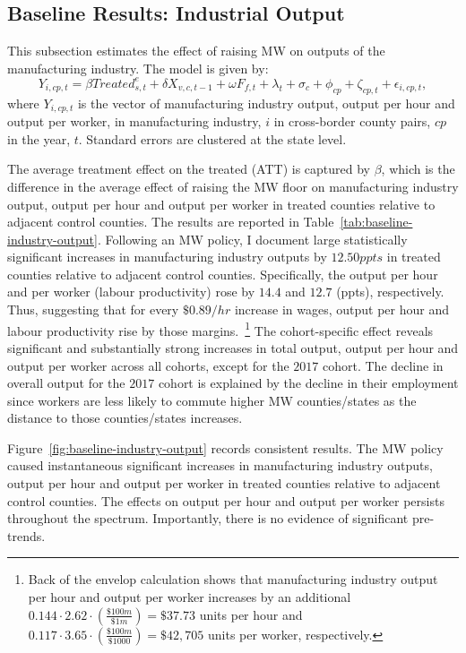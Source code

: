 \documentclass[12pt, english]{article}
\begin{document}
    \subsection{Baseline Results: Industrial Output}\label{subsec:baseline-results-industrial-output}
    This subsection estimates the effect of raising MW on outputs of the manufacturing industry. The model is given by:
    \begin{equation}
        Y_{i,cp,t} = \beta Treated_{s,t}^e + \delta X_{v,c,t-1} + \omega F_{f,t} + \lambda_{t} + \sigma_{c} + \phi_{cp} + \zeta_{cp,t} + \epsilon_{i,cp,t},\label{eq:baseline-output}
    \end{equation}
    where $Y_{i,cp,t}$ is the vector of manufacturing industry output, output per hour and output per worker, in manufacturing industry, $i$ in cross-border county pairs, $cp$ in the year, $t$. Standard errors are clustered at the state level.
    

    The average treatment effect on the treated (ATT) is captured by $\beta$, which is the difference in the average effect of raising the MW floor on manufacturing industry output, output per hour and output per worker in treated counties relative to adjacent control counties. The results are reported in Table~\ref{tab:baseline-industry-output}. Following an MW policy, I document large statistically significant increases in manufacturing industry outputs by $12.50ppts$ in treated counties relative to adjacent control counties. Specifically, the output per hour and per worker (labour productivity) rose by $14.4$ and $12.7$ (ppts), respectively. Thus, suggesting that for every $\$0.89/hr$ increase in wages, output per hour and labour productivity rise by those margins.~\footnote{\tiny Back of the envelop calculation shows that manufacturing industry output per hour and output per worker increases by an additional $0.144 \cdot 2.62 \cdot \left(\frac{\$100m}{\$1m}\right) = \$37.73$ units per hour and $0.117 \cdot 3.65 \cdot \left(\frac{\$100m}{\$1000}\right) = \$42,705$ units per worker, respectively.} The cohort-specific effect reveals significant and substantially strong increases in total output, output per hour and output per worker across all cohorts, except for the $2017$ cohort. The decline in overall output for the $2017$ cohort is explained by the decline in their employment since workers are less likely to commute higher MW counties/states as the distance to those counties/states increases.

    Figure~\ref{fig:baseline-industry-output} records consistent results. The MW policy caused instantaneous significant increases in manufacturing industry outputs, output per hour and output per worker in treated counties relative to adjacent control counties. The effects on output per hour and output per worker persists throughout the spectrum. Importantly, there is no evidence of significant pre-trends.
    
\end{document}
